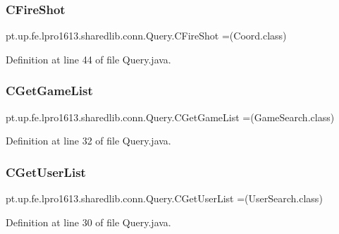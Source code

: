 \subsubsection{\texorpdfstring{C\+Fire\+Shot}{CFireShot}}
{\footnotesize\ttfamily pt.\+up.\+fe.\+lpro1613.\+sharedlib.\+conn.\+Query.\+C\+Fire\+Shot =(Coord.\+class)}



Definition at line 44 of file Query.\+java.

\hypertarget{enumpt_1_1up_1_1fe_1_1lpro1613_1_1sharedlib_1_1conn_1_1_query_a00dbcd99570bca2872b23d1f77a49186}{}\label{enumpt_1_1up_1_1fe_1_1lpro1613_1_1sharedlib_1_1conn_1_1_query_a00dbcd99570bca2872b23d1f77a49186} 
\subsubsection{\texorpdfstring{C\+Get\+Game\+List}{CGetGameList}}
{\footnotesize\ttfamily pt.\+up.\+fe.\+lpro1613.\+sharedlib.\+conn.\+Query.\+C\+Get\+Game\+List =(Game\+Search.\+class)}



Definition at line 32 of file Query.\+java.

\hypertarget{enumpt_1_1up_1_1fe_1_1lpro1613_1_1sharedlib_1_1conn_1_1_query_ae3af9d0613ab8d210b7161a550f7bf14}{}\label{enumpt_1_1up_1_1fe_1_1lpro1613_1_1sharedlib_1_1conn_1_1_query_ae3af9d0613ab8d210b7161a550f7bf14} 
\subsubsection{\texorpdfstring{C\+Get\+User\+List}{CGetUserList}}
{\footnotesize\ttfamily pt.\+up.\+fe.\+lpro1613.\+sharedlib.\+conn.\+Query.\+C\+Get\+User\+List =(User\+Search.\+class)}



Definition at line 30 of file Query.\+java.

